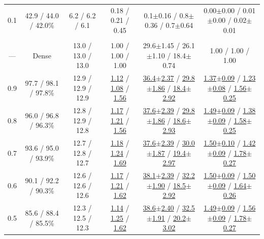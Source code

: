 \begin{table}[!t]
\begin{tabular}{c c c c c c}
0.1 & 42.9 / 44.0 / 42.0\% & 6.2 / 6.2 / 6.1 & 0.18 / 0.21 / 0.45 & 0.1{\scriptsize$\pm$0.16} / 0.8{\scriptsize$\pm$0.36} / 0.7{\scriptsize$\pm$0.64} & 0.00{\scriptsize$\pm$0.00} / 0.01{\scriptsize$\pm$0.00} / 0.02{\scriptsize$\pm$0.01} \\
\addlinespace[0.5pt]
\rowcolor{lightgray} \multicolumn{6}{c}{\rule{0pt}{2.2ex}\textbf{LLaMA-2-13B}\rule[-0.8ex]{0pt}{0pt}} \\
--- & Dense & 13.0 / 13.0 / 13.0 & 1.00 / 1.00 / 1.00 & 29.6{\scriptsize$\pm$1.45} / 26.1{\scriptsize$\pm$1.10} / 18.4{\scriptsize$\pm$0.74} & 1.00 / 1.00 / 1.00 \\
0.9 & 97.7 / 98.1 / 97.8\% & 12.9 / 12.9 / 12.9 & \underline{1.12} / \underline{1.08} / \underline{1.56} & \underline{36.4{\scriptsize$\pm$2.37}} / \underline{29.8{\scriptsize$\pm$1.86}} / \underline{18.4{\scriptsize$\pm$2.92}} & \underline{1.37{\scriptsize$\pm$0.09}} / \underline{1.23{\scriptsize$\pm$0.08}} / \underline{1.56{\scriptsize$\pm$0.25}} \\
0.8 & 96.0 / 96.8 / 96.3\% & 12.8 / 12.9 / 12.8 & \underline{1.17} / \underline{1.21} / \underline{1.56} & \underline{37.6{\scriptsize$\pm$2.39}} / \underline{29.8{\scriptsize$\pm$1.86}} / \underline{18.6{\scriptsize$\pm$2.93}} & \underline{1.49{\scriptsize$\pm$0.09}} / \underline{1.38{\scriptsize$\pm$0.09}} / \underline{1.58{\scriptsize$\pm$0.25}} \\
0.7 & 93.6 / 95.0 / 93.9\% & 12.7 / 12.8 / 12.7 & \underline{1.18} / \underline{1.24} / \underline{1.69} & \underline{37.6{\scriptsize$\pm$2.39}} / \underline{30.0{\scriptsize$\pm$1.87}} / \underline{19.4{\scriptsize$\pm$2.97}} & \underline{1.50{\scriptsize$\pm$0.10}} / \underline{1.42{\scriptsize$\pm$0.09}} / \underline{1.78{\scriptsize$\pm$0.27}} \\
0.6 & 90.1 / 92.2 / 90.3\% & 12.6 / 12.6 / 12.6 & \underline{1.17} / \underline{1.21} / \underline{1.62} & \underline{38.1{\scriptsize$\pm$2.39}} / \underline{32.2{\scriptsize$\pm$1.90}} / \underline{18.5{\scriptsize$\pm$2.92}} & \underline{1.50{\scriptsize$\pm$0.09}} / \underline{1.50{\scriptsize$\pm$0.09}} / \underline{1.64{\scriptsize$\pm$0.26}} \\
0.5 & 85.6 / 88.4 / 85.5\% & 12.3 / 12.5 / 12.3 & \underline{1.14} / \underline{1.25} / \underline{1.62} & \underline{38.6{\scriptsize$\pm$2.40}} / \underline{32.5{\scriptsize$\pm$1.91}} / \underline{20.2{\scriptsize$\pm$3.02}} & \underline{1.49{\scriptsize$\pm$0.09}} / \underline{1.56{\scriptsize$\pm$0.09}} / \underline{1.78{\scriptsize$\pm$0.27}} \\

\end{tabular}
\end{table}
